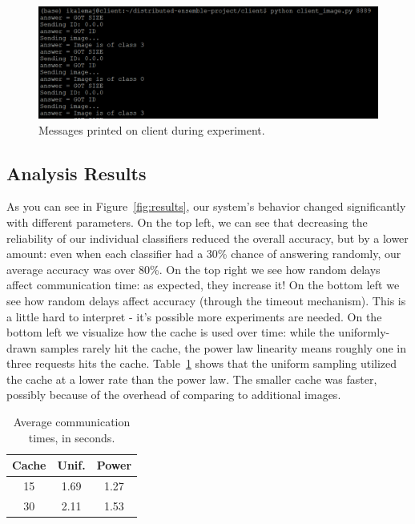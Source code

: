 \documentclass[11pt]{article}
\begin{document}
\begin{figure}[t]
	\centering
	\includegraphics[scale=0.8]{client_screenshot.png}
	\caption{Messages printed on client during experiment.}
	\label{fig:client_screenshot}
\end{figure}

\subsection{Analysis Results}


As you can see in Figure~\ref{fig:results}, our system's behavior changed significantly with different parameters.
On the top left, we can see that decreasing the reliability of our individual classifiers reduced the overall accuracy, but by a lower amount: 
    even when each classifier had a 30\% chance of answering randomly, our average accuracy was over 80\%.
On the top right we see how random delays affect communication time: as expected, they increase it!
On the bottom left we see how random delays affect accuracy (through the timeout mechanism).
This is a little hard to interpret - it's possible more experiments are needed.
On the bottom left we visualize how the cache is used over time: while the uniformly-drawn samples rarely hit the cache, the power law linearity means roughly one in three requests hits the cache.
Table~\ref{tab:cache} shows that the uniform sampling utilized the cache at a lower rate than the power law.
The smaller cache was faster, possibly because of the overhead of comparing to additional images.

\begin{table}
    \begin{tabular}{|c|c|c|}
        \hline
        Cache &  Unif. &  Power \\ \hline \hline
        15 & 1.69 & 1.27 \\ \hline
        30 & 2.11 & 1.53 \\ \hline
    \end{tabular}
    \caption{Average communication times, in seconds.}%
    \label{tab:cache}
\end{table}
\end{document}
